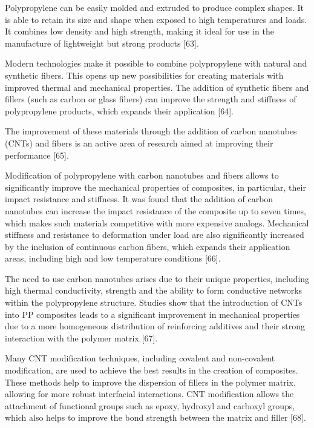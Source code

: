 \begin{multicols}{2}
Polypropylene can be easily molded and extruded to produce complex
shapes. It is able to retain its size and shape when exposed to high
temperatures and loads. It combines low density and high strength,
making it ideal for use in the manufacture of lightweight but strong
products {[}63{]}.

Modern technologies make it possible to combine polypropylene with
natural and synthetic fibers. This opens up new possibilities for
creating materials with improved thermal and mechanical properties. The
addition of synthetic fibers and fillers (such as carbon or glass
fibers) can improve the strength and stiffness of polypropylene
products, which expands their application {[}64{]}.

The improvement of these materials through the addition of carbon
nanotubes (CNTs) and fibers is an active area of research aimed at
improving their performance {[}65{]}.

Modification of polypropylene with carbon nanotubes and fibers allows to
significantly improve the mechanical properties of composites, in
particular, their impact resistance and stiffness. It was found that the
addition of carbon nanotubes can increase the impact resistance of the
composite up to seven times, which makes such materials competitive with
more expensive analogs. Mechanical stiffness and resistance to
deformation under load are also significantly increased by the inclusion
of continuous carbon fibers, which expands their application areas,
including high and low temperature conditions {[}66{]}.

The need to use carbon nanotubes arises due to their unique properties,
including high thermal conductivity, strength and the ability to form
conductive networks within the polypropylene structure. Studies show
that the introduction of CNTs into PP composites leads to a significant
improvement in mechanical properties due to a more homogeneous
distribution of reinforcing additives and their strong interaction with
the polymer matrix {[}67{]}.

Many CNT modification techniques, including covalent and non-covalent
modification, are used to achieve the best results in the creation of
composites. These methods help to improve the dispersion of fillers in
the polymer matrix, allowing for more robust interfacial interactions.
CNT modification allows the attachment of functional groups such as
epoxy, hydroxyl and carboxyl groups, which also helps to improve the
bond strength between the matrix and filler {[}68{]}.


\end{multicols}
